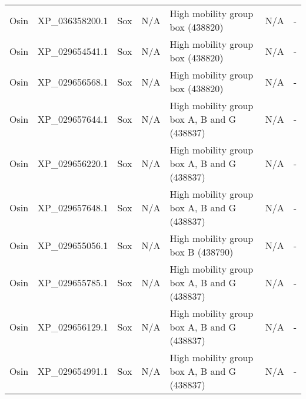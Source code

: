 \documentclass[../main.tex]{subfiles}
\begin{document}
\begin{landscape}
\begin{longtable}{lllllll}
		Osin           & XP\_036358200.1       & Sox            & N/A                 & High mobility group box (438820)            & N/A                                                                    & -                    \\
		Osin           & XP\_029654541.1       & Sox            & N/A                 & High mobility group box (438820)            & N/A                                                                    & -                    \\
		Osin           & XP\_029656568.1       & Sox            & N/A                 & High mobility group box (438820)            & N/A                                                                    & -                    \\
		Osin           & XP\_029657644.1       & Sox            & N/A                 & High mobility group box A, B and G (438837) & N/A                                                                    & -                    \\
		Osin           & XP\_029656220.1       & Sox            & N/A                 & High mobility group box A, B and G (438837) & N/A                                                                    & -                    \\
		Osin           & XP\_029657648.1       & Sox            & N/A                 & High mobility group box A, B and G (438837) & N/A                                                                    & -                    \\
		Osin           & XP\_029655056.1       & Sox            & N/A                 & High mobility group box B (438790)          & N/A                                                                    & -                    \\
		Osin           & XP\_029655785.1       & Sox            & N/A                 & High mobility group box A, B and G (438837) & N/A                                                                    & -                    \\
		Osin           & XP\_029656129.1       & Sox            & N/A                 & High mobility group box A, B and G (438837) & N/A                                                                    & -                    \\
		Osin           & XP\_029654991.1       & Sox            & N/A                 & High mobility group box A, B and G (438837) & N/A                                                                    & -                    \\

\end{longtable}
\end{landscape}
\end{document}

